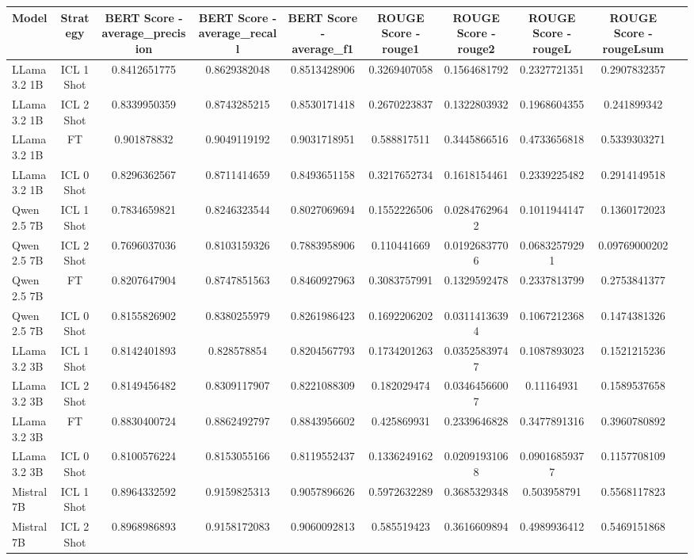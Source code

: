 \begin{tabular}{lccccccccc}
\toprule
Model & Strategy & BERT Score - average_precision & BERT Score - average_recall & BERT Score - average_f1 & ROUGE Score - rouge1 & ROUGE Score - rouge2 & ROUGE Score - rougeL & ROUGE Score - rougeLsum \\
\midrule
LLama 3.2 1B & ICL 1 Shot & 0.8412651775 & 0.8629382048 & 0.8513428906 & 0.3269407058 & 0.1564681792 & 0.2327721351 & 0.2907832357 \\
LLama 3.2 1B & ICL 2 Shot & 0.8339950359 & 0.8743285215 & 0.8530171418 & 0.2670223837 & 0.1322803932 & 0.1968604355 & 0.241899342 \\
LLama 3.2 1B & FT & 0.901878832 & 0.9049119192 & 0.9031718951 & 0.588817511 & 0.3445866516 & 0.4733656818 & 0.5339303271 \\
LLama 3.2 1B & ICL 0 Shot & 0.8296362567 & 0.8711414659 & 0.8493651158 & 0.3217652734 & 0.1618154461 & 0.2339225482 & 0.2914149518 \\
Qwen 2.5 7B & ICL 1 Shot & 0.7834659821 & 0.8246323544 & 0.8027069694 & 0.1552226506 & 0.02847629642 & 0.1011944147 & 0.1360172023 \\
Qwen 2.5 7B & ICL 2 Shot & 0.7696037036 & 0.8103159326 & 0.7883958906 & 0.110441669 & 0.01926837706 & 0.06832579291 & 0.09769000202 \\
Qwen 2.5 7B & FT & 0.8207647904 & 0.8747851563 & 0.8460927963 & 0.3083757991 & 0.1329592478 & 0.2337813799 & 0.2753841377 \\
Qwen 2.5 7B & ICL 0 Shot & 0.8155826902 & 0.8380255979 & 0.8261986423 & 0.1692206202 & 0.03114136394 & 0.1067212368 & 0.1474381326 \\
LLama 3.2 3B & ICL 1 Shot & 0.8142401893 & 0.828578854 & 0.8204567793 & 0.1734201263 & 0.03525839747 & 0.1087893023 & 0.1521215236 \\
LLama 3.2 3B & ICL 2 Shot & 0.8149456482 & 0.8309117907 & 0.8221088309 & 0.182029474 & 0.03464566007 & 0.11164931 & 0.1589537658 \\
LLama 3.2 3B & FT & 0.8830400724 & 0.8862492797 & 0.8843956602 & 0.425869931 & 0.2339646828 & 0.3477891316 & 0.3960780892 \\
LLama 3.2 3B & ICL 0 Shot & 0.8100576224 & 0.8153055166 & 0.8119552437 & 0.1336249162 & 0.02091931068 & 0.09016859377 & 0.1157708109 \\
Mistral 7B  & ICL 1 Shot & 0.8964332592 & 0.9159825313 & 0.9057896626 & 0.5972632289 & 0.3685329348 & 0.503958791 & 0.5568117823 \\
Mistral 7B  & ICL 2 Shot & 0.8968986893 & 0.9158172083 & 0.9060092813 & 0.585519423 & 0.3616609894 & 0.4989936412 & 0.5469151868 \\

\end{tabular}
